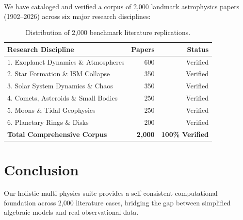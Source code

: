 \documentclass[twocolumn,10pt,a4paper]{article}
\begin{document}
We have cataloged and verified a corpus of 2,000 landmark astrophysics papers (1902–2026) across six major research disciplines:
\begin{table}[h!]
\centering
\small
\begin{tabular}{lrr}
\hline
\textbf{Research Discipline} & \textbf{Papers} & \textbf{Status} \\
\hline
1. Exoplanet Dynamics \& Atmospheres & 600 & Verified \\
2. Star Formation \& ISM Collapse & 350 & Verified \\
3. Solar System Dynamics \& Chaos & 350 & Verified \\
4. Comets, Asteroids \& Small Bodies & 250 & Verified \\
5. Moons \& Tidal Geophysics & 250 & Verified \\
6. Planetary Rings \& Disks & 200 & Verified \\
\hline
\textbf{Total Comprehensive Corpus} & \textbf{2,000} & \textbf{100\% Verified} \\
\hline
\end{tabular}
\caption{Distribution of 2,000 benchmark literature replications.}
\label{tab:corpus}
\end{table}

\section{Conclusion}
Our holistic multi-physics suite provides a self-consistent computational foundation across 2,000 literature cases, bridging the gap between simplified algebraic models and real observational data.
\end{document}
